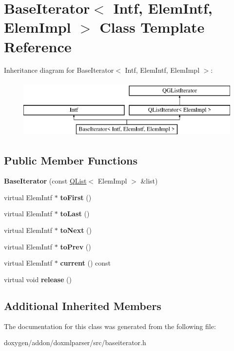 \hypertarget{class_base_iterator}{}\section{Base\+Iterator$<$ Intf, Elem\+Intf, Elem\+Impl $>$ Class Template Reference}
\label{class_base_iterator}
Inheritance diagram for Base\+Iterator$<$ Intf, Elem\+Intf, Elem\+Impl $>$\+:\begin{figure}[H]
\begin{center}
\leavevmode
\includegraphics[height=3.000000cm]{class_base_iterator}
\end{center}
\end{figure}
\subsection*{Public Member Functions}
\begin{DoxyCompactItemize}
\item 
\mbox{\label{class_base_iterator_a024b5a4dafe9f1129d9060e6d976174d}} 
{\bfseries Base\+Iterator} (const \mbox{\hyperlink{class_q_list}{Q\+List}}$<$ Elem\+Impl $>$ \&list)
\item 
\mbox{\label{class_base_iterator_adedd8ee5a49a70b2a9177125b2e19e3c}} 
virtual Elem\+Intf $\ast$ {\bfseries to\+First} ()
\item 
\mbox{\label{class_base_iterator_a2444c29b78a5294c1aab1a6c3ca718c6}} 
virtual Elem\+Intf $\ast$ {\bfseries to\+Last} ()
\item 
\mbox{\label{class_base_iterator_ab1c32f7ac3d1d4d759e15aa9cc466be4}} 
virtual Elem\+Intf $\ast$ {\bfseries to\+Next} ()
\item 
\mbox{\label{class_base_iterator_a93b9aedc8f3aed39e3d2a0fa6d70240d}} 
virtual Elem\+Intf $\ast$ {\bfseries to\+Prev} ()
\item 
\mbox{\label{class_base_iterator_a3a69e5cc9ee3d45b98bfa5a2144db6e0}} 
virtual Elem\+Intf $\ast$ {\bfseries current} () const
\item 
\mbox{\label{class_base_iterator_abb1dc61b349335e463c1cb848ca9e3ee}} 
virtual void {\bfseries release} ()
\end{DoxyCompactItemize}
\subsection*{Additional Inherited Members}


The documentation for this class was generated from the following file\+:\begin{DoxyCompactItemize}
\item 
doxygen/addon/doxmlparser/src/baseiterator.\+h\end{DoxyCompactItemize}

